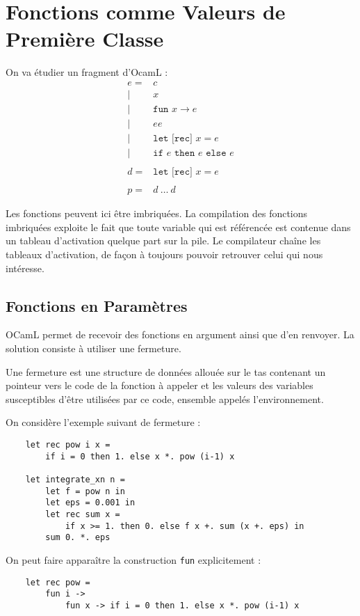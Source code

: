 \documentclass{cours}
\begin{document}
\section{Fonctions comme Valeurs de Première Classe}
On va étudier un fragment d'OcamL : 
\[
    \begin{aligned}
        e =& c \\
        \mid & x \\
        \mid & \texttt{fun } x \rightarrow e \\
        \mid & e e \\
        \mid & \texttt{let [rec] } x = e \\
        \mid & \texttt{if } e \texttt{ then } e \texttt{ else } e\\
        & \\
        d =& \texttt{let [rec] } x = e \\
        & \\
        p =& d \ \ldots \ d
    \end{aligned}    
\]
\begin{remark}
    Les fonctions peuvent ici être imbriquées. La compilation des fonctions imbriquées exploite le fait que toute variable qui est référencée est contenue dans un tableau d'activation quelque part sur la pile. Le compilateur chaîne les tableaux d'activation, de façon à toujours pouvoir retrouver celui qui nous intéresse.\\
\end{remark}

\subsection{Fonctions en Paramètres}
OCamL permet de recevoir des fonctions en argument ainsi que d'en renvoyer. La solution consiste à utiliser une fermeture. 
\begin{definition}
    Une fermeture est une structure de données allouée sur le tas contenant un pointeur vers le code de la fonction à appeler et les valeurs des variables susceptibles d'être utilisées par ce code, ensemble appelés l'environnement.
\end{definition}

On considère l'exemple suivant de fermeture : 
\begin{verbatim}
    let rec pow i x =
        if i = 0 then 1. else x *. pow (i-1) x
    
    let integrate_xn n =
        let f = pow n in
        let eps = 0.001 in
        let rec sum x =
            if x >= 1. then 0. else f x +. sum (x +. eps) in
        sum 0. *. eps
\end{verbatim}
On peut faire apparaître la construction \texttt{fun} explicitement : 
\begin{verbatim}
    let rec pow =
        fun i ->
            fun x -> if i = 0 then 1. else x *. pow (i-1) x
\end{verbatim}
\end{document}
